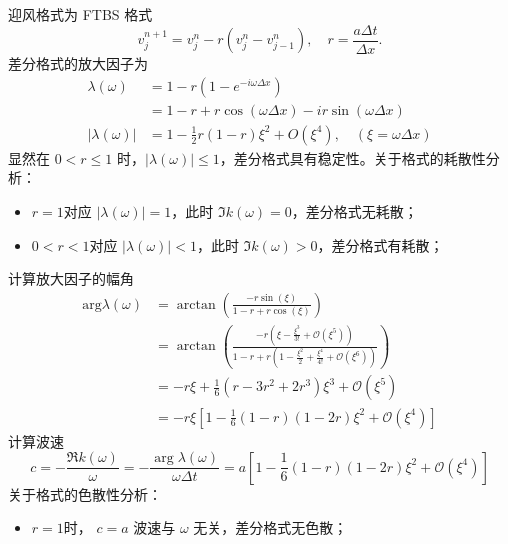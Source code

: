 \begin{solution*}
    迎风格式为 FTBS 格式
    \[
        v_j^{n+1} = v_j^n - r (v_j^n - v_{j-1}^{n}),\quad r = \frac{a \Delta t}{\Delta x}.
    \]
    差分格式的放大因子为
    \begin{align*}
        \lambda(\omega)   & = 1 - r (1 - e^{-i \omega \Delta x})                        \\
                          & = 1 - r + r \cos(\omega\Delta x) - i r \sin(\omega\Delta x) \\
        |\lambda(\omega)| & =
        1 - \frac12 r(1-r) \xi^2 + O(\xi^4),\quad (\xi = \omega \Delta x)
    \end{align*}
    显然在 $ 0< r \le 1$ 时，$|\lambda(\omega)| \le 1$，差分格式具有稳定性。关于格式的耗散性分析：
    \begin{itemize}
        \item $r=1$对应 $|\lambda(\omega)| = 1$，此时 $\Im k(\omega) = 0$，差分格式无耗散；
        \item $0<r<1$对应 $|\lambda(\omega)| < 1$，此时 $\Im k(\omega) > 0$，差分格式有耗散；
    \end{itemize}
    计算放大因子的幅角
    \begin{align*}
        \text{arg} \lambda(\omega) & =
        \arctan \left(\frac{
                - r \sin(\xi)
            }{
                1 - r + r \cos(\xi)
            }     \right)
        \\
                                   & =
        \arctan \left(\frac{
                -r (\xi - \frac{\xi^3}{3!} + \mathcal{O}(\xi^5))
            }{
                1 - r + r\left(
                1 - \frac{\xi^2}2 + \frac{\xi^4}{4!} + \mathcal{O}(\xi^6)
                \right)
        }     \right)                                                   \\
                                   & =
        - r \xi + \frac16 (r - 3r^2 + 2r^3) \xi^3 +  \mathcal{O}(\xi^5) \\
                                   & = - r\xi \left[
            1 - \frac16 (1-r)(1-2r)\xi^2 +  \mathcal{O}(\xi^4)
            \right]
    \end{align*}
    计算波速
    \[
        c = -\frac{\Re k(\omega)}{\omega} = - \frac{\arg \lambda(\omega)}{ \omega\Delta t} = a  \left[
            1 - \frac16 (1-r)(1-2r)\xi^2 +  \mathcal{O}(\xi^4)
            \right]
    \]
    关于格式的色散性分析：
    \begin{itemize}
        \item $r=1$时， $c = a$ 波速与 $\omega$ 无关，差分格式无色散；

\end{itemize}
\end{solution*}
